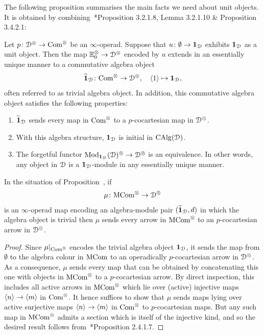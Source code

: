 The following proposition summarises the main facts we need about unit objects. It is obtained by combining~\cite{HA}*{Proposition 3.2.1.8, Lemma 3.2.1.10 \& Proposition 3.4.2.1}: 

\begin{proposition}
\label{proposition:units}%
Let $p\colon \mathcal{D}^\otimes \to \mathrm{Com}^{\otimes}$ be an $\infty$-operad.
Suppose that $u\colon \emptyset \to \mathbf{1}_{\mathcal{D}}$ exhibits $\mathbf{1}_{\mathcal{D}}$ as a unit object. Then the map 
$\mathbb{E}_0^{\otimes} \to \mathcal{D}^{\otimes}$ encoded by $u$ extends in an essentially unique manner to a commutative algebra object 
\[
\widetilde{\mathbf{1}}_{\mathcal{D}}\colon \mathrm{Com}^{\otimes} \to \mathcal{D}^{\otimes}, \quad \langle1\rangle  \mapsto \mathbf{1}_{\mathcal{D}},
\]
often referred to as trivial algebra object. In addition, this commutative algebra object satisfies the following properties:
\begin{enumerate}
\item
$\widetilde{\mathbf{1}}_{\mathcal{D}}$ sends every map in $\mathrm{Com}^\otimes$ to a $p$-cocartesian map in $\mathcal{D}^{\otimes}$.
\item
With this algebra structure, $\mathbf{1}_{\mathcal{D}}$ is initial in $\mathrm{CAlg}(\mathcal{D})$. 
\item
The forgetful functor $\operatorname{Mod}_{\mathbf{1}_{\mathcal{D}}}(\mathcal{D})^{\otimes} \to \mathcal{D}^{\otimes}$ is an equivalence. In other words, any object in $\mathcal{D}$ is a $\mathbf{1}_{\mathcal{D}}$-module in any essentially unique manner.
\end{enumerate}
\end{proposition}



\begin{proposition}
\label{proposition:action-of-mon}%
In the situation of Proposition~, if
\[
\mu \colon \mathrm{MCom}^\otimes \to \mathcal{D}^\otimes
\]
is an $\infty$-operad map encoding an algebra-module pair $(\widetilde{\mathbf{1}}_{\mathcal{D}},d)$ in which the algebra object is trivial then 
$\mu$ sends every arrow in $\mathrm{MCom}^{\otimes}$ to an $p$-cocartesian arrow in $\mathcal{D}^{\otimes}$. %
\end{proposition}
\begin{proof}
Since $\mu|_{\mathrm{Com}^{\otimes}}$ encodes the trivial algebra object $\mathbf{1}_{\mathcal{D}}$, it sends the map from $\emptyset$ to the algebra colour in $\mathrm{MCom}$ to an operadically $p$-cocartesian arrow in $\mathcal{D}^{\otimes}$. As a consequence, $\mu$ sends every map that can be obtained by concatenating this one with objects in $\mathrm{MCom}^{\otimes}$ to a $p$-cocartesian arrow. By direct inspection, this includes all active arrows in $\mathrm{MCom}^{\otimes}$ which lie over (active) injective maps $\langle n\rangle \to \langle m\rangle$ in $\mathrm{Com}^{\otimes}$. It hence suffices to show that $\mu$ sends maps lying over active surjective maps $\langle n\rangle \to \langle m\rangle$ in $\mathrm{Com}^{\otimes}$ to $p$-cocartesian maps. But any such map in $\mathrm{MCom}^{\otimes}$ admits a section which is itself of the injective kind, and so the desired result follows from~\cite{HTT}*{Proposition 2.4.1.7}.
\end{proof}










